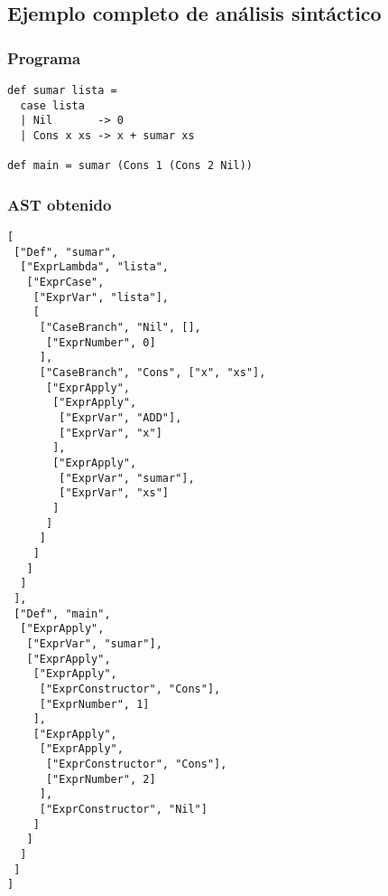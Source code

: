 \documentclass{article}
\begin{document}
\subsection{Ejemplo completo de análisis sintáctico}

\subsubsection*{Programa}

\begin{verbatim}
def sumar lista = 
  case lista
  | Nil       -> 0
  | Cons x xs -> x + sumar xs

def main = sumar (Cons 1 (Cons 2 Nil))
\end{verbatim}

\subsubsection*{AST obtenido}

\begin{verbatim}
[
 ["Def", "sumar",
  ["ExprLambda", "lista",
   ["ExprCase",
    ["ExprVar", "lista"],
    [
     ["CaseBranch", "Nil", [],
      ["ExprNumber", 0]
     ],
     ["CaseBranch", "Cons", ["x", "xs"],
      ["ExprApply",
       ["ExprApply",
        ["ExprVar", "ADD"],
        ["ExprVar", "x"]
       ],
       ["ExprApply",
        ["ExprVar", "sumar"],
        ["ExprVar", "xs"]
       ]
      ]
     ]
    ]
   ]
  ]
 ],
 ["Def", "main",
  ["ExprApply",
   ["ExprVar", "sumar"],
   ["ExprApply",
    ["ExprApply",
     ["ExprConstructor", "Cons"],
     ["ExprNumber", 1]
    ],
    ["ExprApply",
     ["ExprApply",
      ["ExprConstructor", "Cons"],
      ["ExprNumber", 2]
     ],
     ["ExprConstructor", "Nil"]
    ]
   ]
  ]
 ]
]
\end{verbatim}
\end{document}
